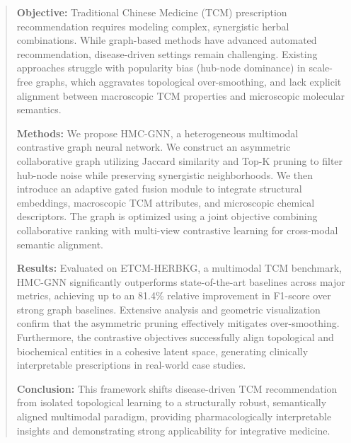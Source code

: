 \documentclass[a4paper,fleqn]{cas-dc}
\begin{document}
\begin{abstract}
\noindent\textbf{Objective:} Traditional Chinese Medicine (TCM) prescription recommendation requires modeling complex, synergistic herbal combinations. While graph-based methods have advanced automated recommendation, disease-driven settings remain challenging. Existing approaches struggle with popularity bias (hub-node dominance) in scale-free graphs, which aggravates topological over-smoothing, and lack explicit alignment between macroscopic TCM properties and microscopic molecular semantics.

\noindent\textbf{Methods:} We propose HMC-GNN, a heterogeneous multimodal contrastive graph neural network. We construct an asymmetric collaborative graph utilizing Jaccard similarity and Top-K pruning to filter hub-node noise while preserving synergistic neighborhoods. We then introduce an adaptive gated fusion module to integrate structural embeddings, macroscopic TCM attributes, and microscopic chemical descriptors. The graph is optimized using a joint objective combining collaborative ranking with multi-view contrastive learning for cross-modal semantic alignment.

\noindent\textbf{Results:} Evaluated on ETCM-HERBKG, a multimodal TCM benchmark, HMC-GNN significantly outperforms state-of-the-art baselines across major metrics, achieving up to an 81.4\% relative improvement in F1-score over strong graph baselines. Extensive analysis and geometric visualization confirm that the asymmetric pruning effectively mitigates over-smoothing. Furthermore, the contrastive objectives successfully align topological and biochemical entities in a cohesive latent space, generating clinically interpretable prescriptions in real-world case studies.

\noindent\textbf{Conclusion:} This framework shifts disease-driven TCM recommendation from isolated topological learning to a structurally robust, semantically aligned multimodal paradigm, providing pharmacologically interpretable insights and demonstrating strong applicability for integrative medicine.
\end{abstract}


\end{document}
